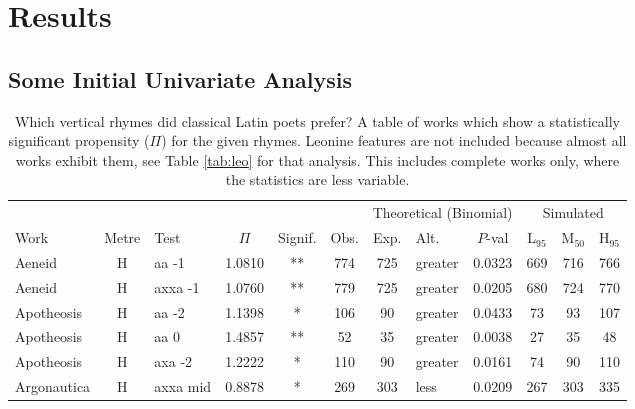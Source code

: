 \documentclass[twocolumn, switch, a4paper]{article} %
\begin{document}
\section{Results}
\label{sec:results}

\subsection{Some Initial Univariate Analysis}

\begin{table}[h!]
\caption{
  Which vertical rhymes did classical Latin poets prefer? A table of works which
  show a statistically significant propensity ($\Pi$) for the given rhymes.
  Leonine features are not included because almost all works exhibit them, see
  Table \ref{tab:leo} for that analysis. This includes complete works only,
  where the statistics are less variable.
}
\label{tab:allbutleo}
\par\medskip
\centering
\begin{adjustbox}{totalheight=0.9\textheight}
  \begin{tabular}{lclcccclcc@{\hspace{1\tabcolsep}}c@{\hspace{1\tabcolsep}}c}
  \toprule
          &&&&&&\multicolumn{3}{c}{Theoretical (Binomial)}&\multicolumn{3}{c}{Simulated}\\\cmidrule(lr{2pt}){7-9}\cmidrule(l{2pt}r){10-12}
          Work & Metre &       Test &    $\Pi$ & Signif. &    Obs. &  Exp. & Alt. &  $P$-val & L$_{95}$ &  M$_{50}$ &  H$_{95}$ \\
  \midrule
        Aeneid &     H &     aa -1 & 1.0810 &    ** &   774 &       725 &     greater & 0.0323 &   669 &   716 &   766 \\
        Aeneid &     H &   axxa -1 & 1.0760 &    ** &   779 &       725 &     greater & 0.0205 &   680 &   724 &   770 \\
    Apotheosis &     H &     aa -2 & 1.1398 &     * &   106 &        90 &     greater & 0.0433 &    73 &    93 &   107 \\
    Apotheosis &     H &      aa 0 & 1.4857 &    ** &    52 &        35 &     greater & 0.0038 &    27 &    35 &    48 \\
    Apotheosis &     H &    axa -2 & 1.2222 &     * &   110 &        90 &     greater & 0.0161 &    74 &    90 &   110 \\
   Argonautica &     H &  axxa mid & 0.8878 &     * &   269 &       303 &        less & 0.0209 &   267 &   303 &   335 \\

\end{tabular}
\end{adjustbox}
\end{table}
\end{document}
